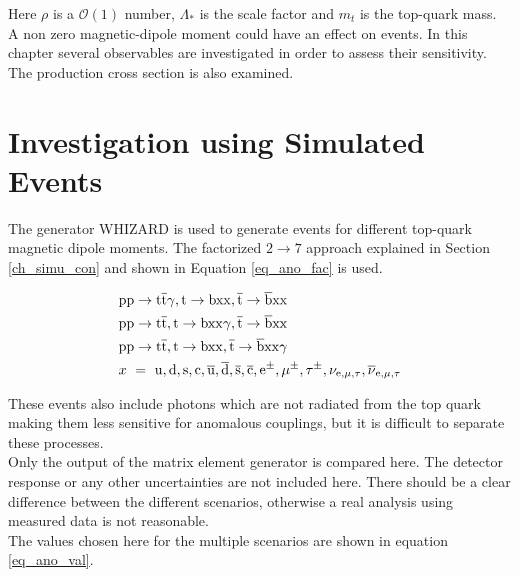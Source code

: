Here $\rho$ is a $\mathcal{O}(1)$ number, $\Lambda_{\ast}$ is the scale factor and $m_t$ is the top-quark mass.\\
A non zero magnetic-dipole moment could have an effect on \ttgamma events. In this chapter several observables are investigated in order to assess their sensitivity. The production cross section is also examined.

\section{Investigation using Simulated Events}

The generator WHIZARD is used to generate events for different top-quark magnetic dipole moments. The factorized $2 \to 7$ approach explained in Section \ref{ch_simu_con} and shown in Equation \ref{eq_ano_fac} is used.

\begin{equation}
\begin{split}
& \mathrm{pp}\to \mathrm{t}\overline{\mathrm{t}} \gamma,  \mathrm{t} \to \mathrm{bxx},  \overline{\mathrm{t}} \to \overline{\mathrm{b}} \mathrm{xx} \\
& \mathrm{pp}\to \mathrm{t} \overline{\mathrm{t}},  \mathrm{t} \to \mathrm{bxx} \gamma,  \overline{\mathrm{t}} \to \overline{\mathrm{b}} \mathrm{xx} \\
& \mathrm{pp}\to \mathrm{t} \overline{\mathrm{t}},  \mathrm{t} \to \mathrm{bxx},  \overline{\mathrm{t}} \to \overline{\mathrm{b}} \mathrm{xx} \gamma \\
&  x\ = \ \mathrm{u}, \mathrm{d}, \mathrm{s}, \mathrm{c}, \overline{\mathrm{u}}, \overline{\mathrm{d}},  \overline{\mathrm{s}},  \overline{\mathrm{c}}, \mathrm{e}^{\pm}, \mu^{\pm}, \tau^{\pm}, \nu_{\mathrm{e},\mu,\tau}, \overline{\nu}_{\mathrm{e},\mu,\tau} 
\end{split}
\label{eq_ano_fac}
\end{equation}

These events also include photons which are not radiated from the top quark making them less sensitive for anomalous couplings, but it is difficult to separate these processes.\\
Only the output of the matrix element generator is compared here. The detector response or any other uncertainties are not included here.
There should be a clear difference between the different scenarios, otherwise a real analysis using measured data is not reasonable.\\
The values chosen here for the multiple scenarios are shown in equation \ref{eq_ano_val}.

